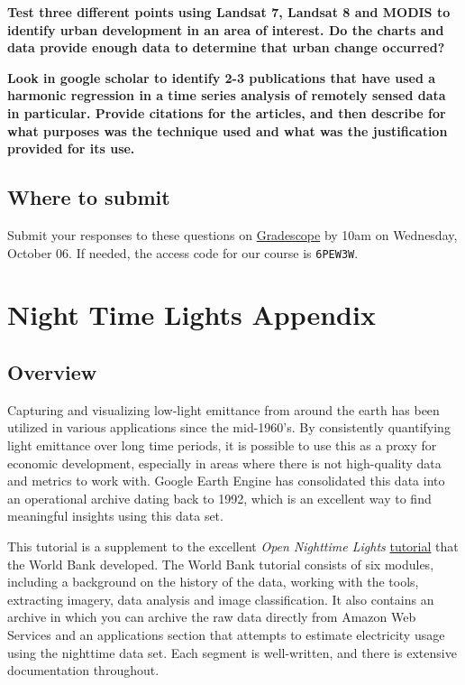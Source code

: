 \documentclass[
]{article}
\begin{document}
\textbf{Test three different points using Landsat 7, Landsat 8 and MODIS to identify urban development in an area of interest. Do the charts and data provide enough data to determine that urban change occurred?}

\textbf{Look in google scholar to identify 2-3 publications that have used a harmonic regression in a time series analysis of remotely sensed data in particular. Provide citations for the articles, and then describe for what purposes was the technique used and what was the justification provided for its use.}

\hypertarget{where-to-submit-4}{%
\subsection*{Where to submit}\label{where-to-submit-4}}

Submit your responses to these questions on \href{https://www.gradescope.com/courses/293173/assignments/1446622/submissions}{Gradescope} by 10am on Wednesday, October 06. If needed, the access code for our course is \texttt{6PEW3W}.

\hypertarget{lab6}{%
\section{Night Time Lights Appendix}\label{lab6}}

\hypertarget{overview-6}{%
\subsection*{Overview}\label{overview-6}}

Capturing and visualizing low-light emittance from around the earth has been utilized in various applications since the mid-1960's. By consistently quantifying light emittance over long time periods, it is possible to use this as a proxy for economic development, especially in areas where there is not high-quality data and metrics to work with. Google Earth Engine has consolidated this data into an operational archive dating back to 1992, which is an excellent way to find meaningful insights using this data set.

This tutorial is a supplement to the excellent \emph{Open Nighttime Lights} \href{https://worldbank.github.io/OpenNightLights/welcome.html}{tutorial} that the World Bank developed. The World Bank tutorial consists of six modules, including a background on the history of the data, working with the tools, extracting imagery, data analysis and image classification. It also contains an archive in which you can archive the raw data directly from Amazon Web Services and an applications section that attempts to estimate electricity usage using the nighttime data set. Each segment is well-written, and there is extensive documentation throughout.
\end{document}
